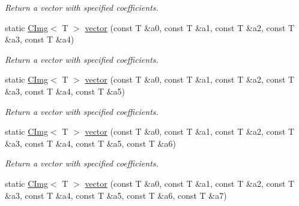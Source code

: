 \begin{DoxyCompactItemize}
\begin{DoxyCompactList}\small\item\em Return a vector with specified coefficients. \item\end{DoxyCompactList}\item 
\hypertarget{structcimg__library_1_1CImg_a26e0f59a179718455ee57fcd618ada21}{
static \hyperlink{structcimg__library_1_1CImg}{CImg}$<$ T $>$ \hyperlink{structcimg__library_1_1CImg_a26e0f59a179718455ee57fcd618ada21}{vector} (const T \&a0, const T \&a1, const T \&a2, const T \&a3, const T \&a4)}
\label{structcimg__library_1_1CImg_a26e0f59a179718455ee57fcd618ada21}

\begin{DoxyCompactList}\small\item\em Return a vector with specified coefficients. \item\end{DoxyCompactList}\item 
\hypertarget{structcimg__library_1_1CImg_a0c3c919f0637431613b51cfd8a4a7638}{
static \hyperlink{structcimg__library_1_1CImg}{CImg}$<$ T $>$ \hyperlink{structcimg__library_1_1CImg_a0c3c919f0637431613b51cfd8a4a7638}{vector} (const T \&a0, const T \&a1, const T \&a2, const T \&a3, const T \&a4, const T \&a5)}
\label{structcimg__library_1_1CImg_a0c3c919f0637431613b51cfd8a4a7638}

\begin{DoxyCompactList}\small\item\em Return a vector with specified coefficients. \item\end{DoxyCompactList}\item 
\hypertarget{structcimg__library_1_1CImg_a7b1db07e34ac249af7b64b1a46e183c2}{
static \hyperlink{structcimg__library_1_1CImg}{CImg}$<$ T $>$ \hyperlink{structcimg__library_1_1CImg_a7b1db07e34ac249af7b64b1a46e183c2}{vector} (const T \&a0, const T \&a1, const T \&a2, const T \&a3, const T \&a4, const T \&a5, const T \&a6)}
\label{structcimg__library_1_1CImg_a7b1db07e34ac249af7b64b1a46e183c2}

\begin{DoxyCompactList}\small\item\em Return a vector with specified coefficients. \item\end{DoxyCompactList}\item 
\hypertarget{structcimg__library_1_1CImg_a78326ef7939a5caa29698ae4185b1ca9}{
static \hyperlink{structcimg__library_1_1CImg}{CImg}$<$ T $>$ \hyperlink{structcimg__library_1_1CImg_a78326ef7939a5caa29698ae4185b1ca9}{vector} (const T \&a0, const T \&a1, const T \&a2, const T \&a3, const T \&a4, const T \&a5, const T \&a6, const T \&a7)}
\label{structcimg__library_1_1CImg_a78326ef7939a5caa29698ae4185b1ca9}


\end{DoxyCompactItemize}
